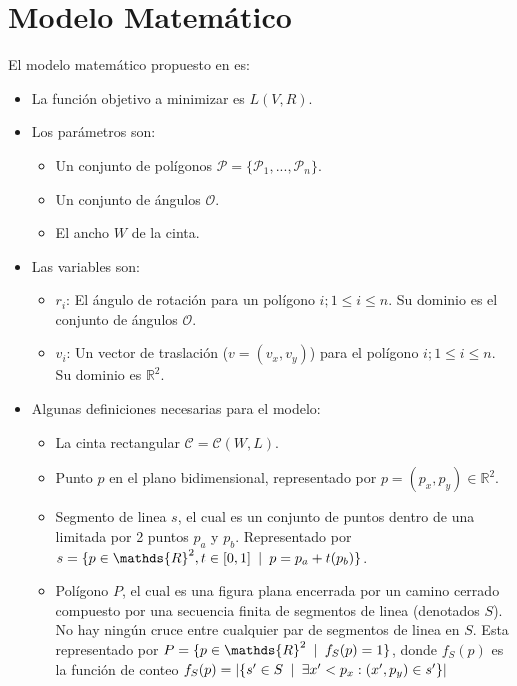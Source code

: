 \section{Modelo Matemático}

El modelo matemático propuesto en \cite{Leung2012LocalSearch} es:

\begin{itemize}
    \item La función objetivo a minimizar es $L(V, R)$.
    \item Los parámetros son:
    \begin{itemize}
        \item Un conjunto de polígonos $\mathcal{P} = \{\mathcal{P}_1, ..., \mathcal{P}_n\}$.
        \item Un conjunto de ángulos $\mathcal{O}$.
        \item El ancho $W$ de la cinta.
    \end{itemize}
    \item Las variables son:
    \begin{itemize}
        \item $r_i$: El ángulo de rotación para un polígono $i; 1 \leq i \leq n$. Su dominio es el conjunto de ángulos $\mathcal{O}$.
        \item $v_i$: Un vector de traslación ($v = (v_x, v_y)$) para el polígono $i; 1 \leq i \leq n$. Su dominio es $\mathds{R}^2$.
    \end{itemize}
    
    \item Algunas definiciones necesarias para el modelo:
    \begin{itemize}
        \item La cinta rectangular $\mathcal{C} = \mathcal{C}(W, L)$.
        
        \item Punto $p$ en el plano bidimensional, representado por $p = (p_x, p_y) \in \mathds{R}^2$.

        \item Segmento de linea $s$, el cual es un conjunto de puntos dentro de una limitada por 2 puntos $p_a$ y $p_b$. Representado por $s = \{p \in \mathds{R}^2, t\in [0, 1] \talque p = p_a + t (p_b) \}$.

        \item Polígono $P$, el cual es una figura plana encerrada por un camino cerrado compuesto por una secuencia finita de segmentos de linea (denotados $S$). No hay ningún cruce entre cualquier par de segmentos de linea en $S$. Esta representado por $P = \{p \in \mathds{R}^2 \talque f_S(p) = 1 \}$, donde $f_S(p)$ es la función de conteo $f_S(p) = |\{s' \in S \texttt{ } | \texttt{ } \exists x' < p_x: (x', p_y) \in s'\}|$
        

\end{itemize}
\end{itemize}
